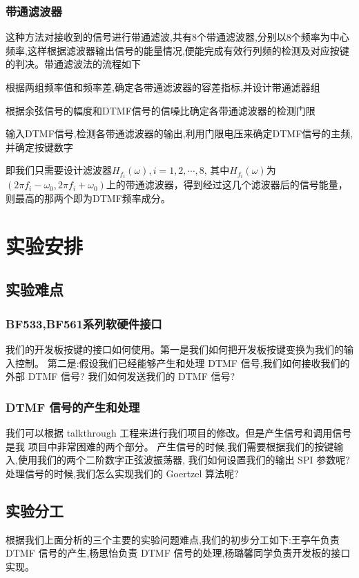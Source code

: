 \documentclass{article}
\begin{document}
\begin{CJK}{UTF8}{gbsn}
\subsubsection{带通滤波器}
这种方法对接收到的信号进行带通滤波,共有$8$个带通滤波器,分别以$8$个频率为中心频率,这样根据滤波器输出信号的能量情况,便能完成有效行列频的检测及对应按键的判决。带通滤波法的流程如下
	\begin{compactenum}
	\item 根据两组频率值和频率差,确定各带通滤波器的容差指标,并设计带通滤器组
	\item 根据余弦信号的幅度和DTMF信号的信噪比确定各带通滤波器的检测门限
	\item 输入DTMF信号,检测各带通滤波器的输出,利用门限电压来确定DTMF信号的主频,并确定按键数字
	\end{compactenum}
即我们只需要设计滤波器$H_{f_i}(\omega),i=1,2,\cdots,8$, 其中$H_{f_i}(\omega)$为$\left(2\pi f_i -\omega_0,2\pi f_i +\omega_0 \right)$上的带通滤波器，得到经过这几个滤波器后的信号能量，则最高的那两个即为DTMF频率成分。
\section{实验安排}
\subsection{实验难点}
\subsubsection{BF533,BF561系列软硬件接口}
我们的开发板按键的接口如何使用。第一是我们如何把开发板按键变换为我们的输入控制。
第二是:假设我们已经能够产生和处理 DTMF 信号,我们如何接收我们的外部 DTMF 信号?
我们如何发送我们的 DTMF 信号?
\subsubsection{DTMF 信号的产生和处理}
我们可以根据 talkthrough 工程来进行我们项目的修改。但是产生信号和调用信号是我
项目中非常困难的两个部分。
产生信号的时候,我们需要根据我们的按键输入,使用我们的两个二阶数字正弦波振荡器,
我们如何设置我们的输出 SPI 参数呢?
处理信号的时候,我们怎么实现我们的 Goertzel 算法呢?
\subsection{实验分工}
根据我们上面分析的三个主要的实验问题难点,我们的初步分工如下:王亭午负责 DTMF 信号的产生,杨思怡负责 DTMF 信号的处理,杨璐馨同学负责开发板的接口实现。

\end{CJK}
\end{document}

